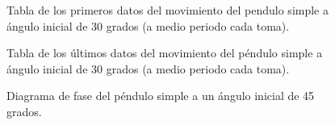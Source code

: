 \documentclass[aps,twocolumn,secnumarabic,nobalancelastpage,amsmath,amssymb,nofootinbib]{revtex4-1}
\begin{document}
		\begin{figure}[!htb]
			\caption{Tabla de los primeros datos del movimiento del pendulo simple a \'angulo inicial de 30 grados (a medio periodo cada toma).}
			\label{fig:penduloSimple30}
		\end{figure} 
		
		\begin{figure}[!htb]
			\caption{Tabla de los \'ultimos datos del movimiento del p\'endulo simple a \'angulo inicial de 30 grados (a medio periodo cada toma).}
		\end{figure} 
	
		\begin{figure}[!htb]
			\caption{Diagrama de fase del p\'endulo simple a un \'angulo inicial de 45 grados.}
			\label{fig:DiagramaFase45}
		\end{figure} 	
		
\end{document}
